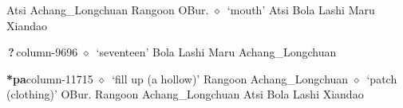         Atsi 
\hspace{1ex}
         Achang\_Longchuan 
\hspace{1ex}
         Rangoon 
\hspace{1ex}
         OBur. 
\hspace{1ex}
         $\diamond$~`mouth'
         Atsi 
\hspace{1ex}
         Bola 
\hspace{1ex}
         Lashi 
\hspace{1ex}
         Maru 
\hspace{1ex}
         Xiandao 
  \item {\footnotesize \textbf{\,?\,}}{\tiny column-9696}
         $\diamond$~`seventeen'
         Bola 
\hspace{1ex}
         Lashi 
\hspace{1ex}
         Maru 
\hspace{1ex}
         Achang\_Longchuan 
  \item {\footnotesize \textbf{*pa}}{\tiny column-11715}
         $\diamond$~`fill up (a hollow)'
         Rangoon 
\hspace{1ex}
         Achang\_Longchuan 
\hspace{1ex}
         $\diamond$~`patch (clothing)'
         OBur. 
\hspace{1ex}
         Rangoon 
\hspace{1ex}
         Achang\_Longchuan 
\hspace{1ex}
         Atsi 
\hspace{1ex}
         Bola 
\hspace{1ex}
         Lashi 
\hspace{1ex}
         Xiandao 
\hspace{1ex}
